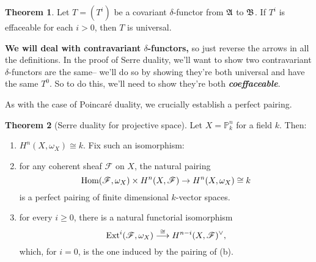 \documentclass[10pt,reqno]{amsart}
\theoremstyle{definition}
\newtheorem{theorem}{Theorem}
\theoremstyle{remark}
\numberwithin{equation}{section}
\numberwithin{theorem}{section}
\newcommand{\Hom}{\textup{Hom}}
\newcommand{\Ext}{\textup{Ext}}
\newcommand{\FF}{{\mathscr F}}
\newcommand{\PP}{{\mathbb P}}
\begin{document}
\begin{theorem} Let $T = (T^i)$ be a covariant $\delta$-functor from $\frak{A}$ to $\frak{B}$. If $T^i$ is effaceable for each $i > 0$, then $T$ is universal.
\end{theorem}

\textbf{We will deal with contravariant $\delta$-functors,} so just reverse the arrows in all the definitions. In the proof of Serre duality, we'll want to show two contravariant $\delta$-functors are the same-- we'll do so by showing they're both universal and have the same $T^0$. So to do this, we'll need to show they're both \textbf{\textit{coeffaceable}}.

As with the case of Poincar\'e duality, we crucially establish a perfect pairing.

\begin{theorem}[Serre duality for projective space] Let $X = \PP^n_k$ for a field $k$. Then:
\begin{enumerate}
\item $H^n(X,\omega_X) \cong k$. Fix such an isomorphism:
\item for any coherent sheaf $\FF$ on $X$, the natural pairing
\[\Hom(\FF,\omega_X) \times H^n(X,\FF) \to H^n(X,\omega_X) \cong k\]
is a perfect pairing of finite dimensional $k$-vector spaces.
\item for every $i \ge 0$, there is a natural functorial isomorphism
\[\Ext^i(\FF,\omega_X) \stackrel{\cong}{\longrightarrow} H^{n-i}(X,\FF)^{\vee},\]
which, for $i = 0$, is the one induced by the pairing of (b).
\end{enumerate}
\end{theorem}
\end{document}
